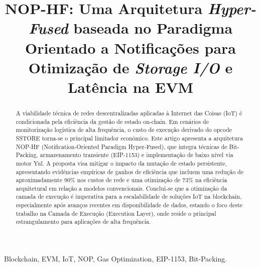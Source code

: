 \documentclass[conference]{IEEEtran}
\begin{document}
\title{NOP-HF: Uma Arquitetura \textit{Hyper-Fused} baseada no Paradigma Orientado a Notificações para Otimização de \textit{Storage I/O} e Latência na EVM}

\author{
}

\maketitle

\begin{abstract}
A viabilidade técnica de redes descentralizadas aplicadas à Internet das Coisas (IoT) é condicionada pela eficiência da gestão de estado on-chain. Em cenários de monitorização logística de alta frequência, o custo de execução derivado do opcode SSTORE torna-se o principal limitador económico. Este artigo apresenta a arquitetura NOP-HF (Notification-Oriented Paradigm Hyper-Fused), que integra técnicas de Bit-Packing, armazenamento transiente (EIP-1153) e implementação de baixo nível via motor Yul. A proposta visa mitigar o impacto da mutação de estado persistente, apresentando evidências empíricas de ganhos de eficiência que incluem uma redução de aproximadamente 90\% nos custos de rede e uma otimização de 73\% na eficiência arquitetural em relação a modelos convencionais. Conclui-se que a otimização da camada de execução é imperativa para a escalabilidade de soluções IoT na blockchain, especialmente após avanços recentes em disponibilidade de dados, estando o foco deste trabalho na Camada de Execução (Execution Layer), onde reside o principal estrangulamento para aplicações de alta frequência.
\end{abstract}

\begin{IEEEkeywords}
Blockchain, EVM, IoT, NOP, Gas Optimization, EIP-1153, Bit-Packing.
\end{IEEEkeywords}
\end{document}
